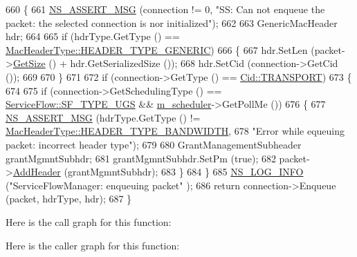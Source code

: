 \begin{DoxyCode}
660 \{
661   \hyperlink{assert_8h_aff5ece9066c74e681e74999856f08539}{NS\_ASSERT\_MSG} (connection != 0, \textcolor{stringliteral}{"SS: Can not enqueue the packet: the selected connection is
       nor initialized"});
662 
663   GenericMacHeader hdr;
664 
665   \textcolor{keywordflow}{if} (hdrType.GetType () == \hyperlink{classns3_1_1MacHeaderType_a54d8fc8bc93a2b7865627965cdd31c20a48fe5b2f20cadf78008c71469b518403}{MacHeaderType::HEADER\_TYPE\_GENERIC})
666     \{
667       hdr.SetLen (packet->\hyperlink{classns3_1_1Packet_a462855c9929954d4301a4edfe55f4f1c}{GetSize} () + hdr.GetSerializedSize ());
668       hdr.SetCid (connection->GetCid ());
669 
670     \}
671 
672   \textcolor{keywordflow}{if} (connection->GetType () == \hyperlink{classns3_1_1Cid_a10b8f92080ca5790e65a0bfa2f557e0aa46fbed56841c3bf471aa84de022edf87}{Cid::TRANSPORT})
673     \{
674 
675       \textcolor{keywordflow}{if} (connection->GetSchedulingType () == \hyperlink{classns3_1_1ServiceFlow_a7990ba10be1e098328fd1e6382a26235a969e0b62fa12fef1dbb23913744ed594}{ServiceFlow::SF\_TYPE\_UGS} && 
      \hyperlink{classns3_1_1SubscriberStationNetDevice_a38477cd45dd6e6ea0f259ebd33e40e1a}{m\_scheduler}->GetPollMe ())
676         \{
677           \hyperlink{assert_8h_aff5ece9066c74e681e74999856f08539}{NS\_ASSERT\_MSG} (hdrType.GetType () != 
      \hyperlink{classns3_1_1MacHeaderType_a54d8fc8bc93a2b7865627965cdd31c20a10501251f4c20ab02eb98217c4171e0e}{MacHeaderType::HEADER\_TYPE\_BANDWIDTH},
678                          \textcolor{stringliteral}{"Error while equeuing  packet: incorrect header type"});
679 
680           GrantManagementSubheader grantMgmntSubhdr;
681           grantMgmntSubhdr.SetPm (\textcolor{keyword}{true});
682           packet->\hyperlink{classns3_1_1Packet_a465108c595a0bc592095cbcab1832ed8}{AddHeader} (grantMgmntSubhdr);
683         \}
684     \}
685   \hyperlink{group__logging_gafbd73ee2cf9f26b319f49086d8e860fb}{NS\_LOG\_INFO} (\textcolor{stringliteral}{"ServiceFlowManager: enqueuing packet"} );
686   \textcolor{keywordflow}{return} connection->Enqueue (packet, hdrType, hdr);
687 \}
\end{DoxyCode}


Here is the call graph for this function\+:




Here is the caller graph for this function\+:


